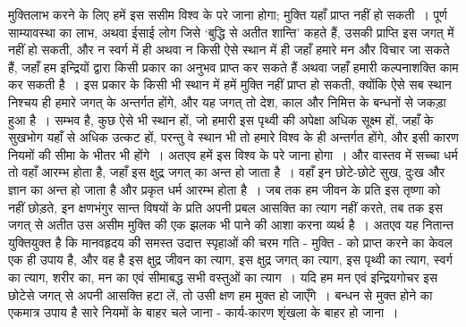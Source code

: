 मुक्तिलाभ करने के लिए हमें इस ससीम विश्व के परे जाना होगा; मुक्ति यहाँ प्राप्त नहीं हो सकती~। पूर्ण साम्यावस्था का लाभ, अथवा ईसाई लोग जिसे ‘बुद्धि से अतीत शान्ति’ कहते हैं, उसकी प्राप्ति इस जगत् में नहीं हो सकती, और न स्वर्ग में ही अथवा न किसी ऐसे स्थान में ही जहाँ हमारे मन और विचार जा सकते हैं, जहाँ हम इन्द्रियों द्वारा किसी प्रकार का अनुभव प्राप्त कर सकते हैं अथवा जहाँ हमारी कल्पनाशक्ति काम कर सकती है~। इस प्रकार के किसी भी स्थान में हमें मुक्ति नहीं प्राप्त हो सकती, क्योंकि ऐसे सब स्थान निश्चय ही हमारे जगत् के अन्तर्गत होंगे, और यह जगत् तो देश, काल और निमित्त के बन्धनों से जकड़ा हुआ है~। सम्भव है, कुछ ऐसे भी स्थान हों, जो हमारी इस पृथ्वी की अपेक्षा अधिक सूक्ष्म हों, जहाँ के सुखभोग यहाँ से अधिक उत्कट हों, परन्तु वे स्थान भी तो हमारे विश्व के ही अन्तर्गत होंगे, और इसी कारण नियमों की सीमा के भीतर भी होंगे~। अतएव हमें इस विश्व के परे जाना होगा~। और वास्तव में सच्चा धर्म तो वहाँ आरम्भ होता है, जहाँ इस क्षुद्र जगत् का अन्त हो जाता है~। वहाँ इन छोटे-छोटे सुख, दुःख और ज्ञान का अन्त हो जाता है और प्रकृत धर्म आरम्भ होता है~। जब तक हम जीवन के प्रति इस तृष्णा को नहीं छोड़ते, इन क्षणभंगुर सान्त विषयों के प्रति अपनी प्रबल आसक्ति का त्याग नहीं करते, तब तक इस जगत् से अतीत उस असीम मुक्ति की एक झलक भी पाने की आशा करना व्यर्थ है~। अतएव यह नितान्त युक्तियुक्त है कि मानवहृदय की समस्त उदात्त स्पृहाओं की चरम गति - मुक्ति - को प्राप्त करने का केवल एक ही उपाय है, और वह है इस क्षुद्र जीवन का त्याग, इस क्षुद्र जगत् का त्याग, इस पृथ्वी का त्याग, स्वर्ग का त्याग, शरीर का, मन का एवं सीमाबद्ध सभी वस्तुओं का त्याग~। यदि हम मन एवं इन्द्रियगोचर इस छोटेसे जगत् से अपनी आसक्ति हटा लें, तो उसी क्षण हम मुक्त हो जाएँगे~। बन्धन से मुक्त होने का एकमात्र उपाय है सारे नियमों के बाहर चले जाना - कार्य-कारण शृंखला के बाहर हो जाना~।

